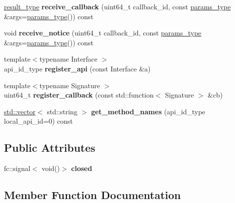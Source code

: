 \begin{DoxyCompactItemize}
\mbox{\hyperlink{classstd_1_1vector}{result\+\_\+type}} {\bfseries receive\+\_\+callback} (uint64\+\_\+t callback\+\_\+id, const \mbox{\hyperlink{classstd_1_1vector}{params\+\_\+type}} \&args=\mbox{\hyperlink{classstd_1_1vector}{params\+\_\+type}}()) const
\item 
\mbox{\label{classfc_1_1binary__api__connection_a1f599aec11f482a0129788eed1327982}} 
void {\bfseries receive\+\_\+notice} (uint64\+\_\+t callback\+\_\+id, const \mbox{\hyperlink{classstd_1_1vector}{params\+\_\+type}} \&args=\mbox{\hyperlink{classstd_1_1vector}{params\+\_\+type}}()) const
\item 
\mbox{\label{classfc_1_1binary__api__connection_a2948663f79c2bb806351873d5433b4c8}} 
{\footnotesize template$<$typename Interface $>$ }\\api\+\_\+id\+\_\+type {\bfseries register\+\_\+api} (const Interface \&a)
\item 
\mbox{\label{classfc_1_1binary__api__connection_a8918ff5fdb0058166b54fef916331afa}} 
{\footnotesize template$<$typename Signature $>$ }\\uint64\+\_\+t {\bfseries register\+\_\+callback} (const std\+::function$<$ Signature $>$ \&cb)
\item 
\mbox{\label{classfc_1_1binary__api__connection_aea3fafc93b95de3a43c0e923d50f34b9}} 
\mbox{\hyperlink{classstd_1_1vector}{std\+::vector}}$<$ std\+::string $>$ {\bfseries get\+\_\+method\+\_\+names} (api\+\_\+id\+\_\+type local\+\_\+api\+\_\+id=0) const
\end{DoxyCompactItemize}
\subsection*{Public Attributes}
\begin{DoxyCompactItemize}
\item 
\mbox{\label{classfc_1_1binary__api__connection_a1ae80889395951dff4c6fc5e18fa839a}} 
fc\+::signal$<$ void()$>$ {\bfseries closed}
\end{DoxyCompactItemize}


\subsection{Member Function Documentation}
\mbox{\label{classfc_1_1binary__api__connection_af4db40adde5c6271df5163f5e3e7159f}} 
